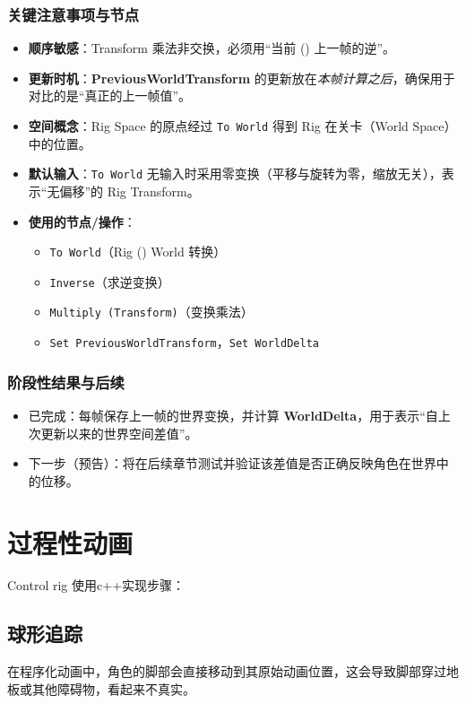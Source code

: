 \documentclass[math,code,12pt]{amznotes}
\newcommand{\il}[1]{\texttt{#1}}%
\begin{document}
\subsection*{关键注意事项与节点}
\begin{itemize}
\item \textbf{顺序敏感}：Transform 乘法非交换，必须用“当前 (\times) 上一帧的逆”。
\item \textbf{更新时机}：\textbf{PreviousWorldTransform} 的更新放在\emph{本帧计算之后}，确保用于对比的是“真正的上一帧值”。
\item \textbf{空间概念}：Rig Space 的原点经过 \il{To World} 得到 Rig 在关卡（World Space）中的位置。
\item \textbf{默认输入}：\il{To World} 无输入时采用零变换（平移与旋转为零，缩放无关），表示“无偏移”的 Rig Transform。
\item \textbf{使用的节点/操作}：
\begin{itemize}
\item \il{To World}（Rig (\rightarrow) World 转换）
\item \il{Inverse}（求逆变换）
\item \il{Multiply (Transform)}（变换乘法）
\item \il{Set PreviousWorldTransform}，\il{Set WorldDelta}
\end{itemize}
\end{itemize}

\subsection*{阶段性结果与后续}
\begin{itemize}
\item 已完成：每帧保存上一帧的世界变换，并计算 \textbf{WorldDelta}，用于表示“自上次更新以来的世界空间差值”。
\item 下一步（预告）：将在后续章节测试并验证该差值是否正确反映角色在世界中的位移。
\end{itemize}



    \chapter{过程性动画}
    Control rig 使用c++实现步骤：
    \section{球形追踪}
    在程序化动画中，角色的脚部会直接移动到其原始动画位置，这会导致脚部穿过地板或其他障碍物，看起来不真实。
    
\end{document}

